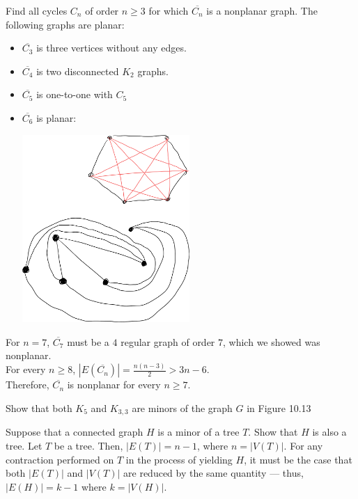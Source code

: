 \documentclass[8pt]{extarticle}
\begin{document}
  \begin{problem}{8}
    Find all cycles $C_n$ of order $n\geq 3$ for which $\overline{C_n}$ is a nonplanar graph.
    \tcblower
    The following graphs are planar:
    \begin{itemize}
      \item $\overline{C_3}$ is three vertices without any edges.
      \item $\overline{C_4}$ is two disconnected $K_2$ graphs.
      \item $\overline{C_5}$ is one-to-one with $C_5$
      \item $\overline{C_6}$ is planar:
        \begin{center}
          \includegraphics[width=0.5\textwidth]{images/10_8_sol.png}
        \end{center}
    \end{itemize}
    For $n = 7$, $ \overline{C_7} $ must be a $4$ regular graph of order $7$, which we showed was nonplanar.\\

    For every $n\geq 8$, $|E(\overline{C_n})| = \frac{n(n-3)}{2} > 3n-6$.\\

    Therefore, $\overline{C_n}$ is nonplanar for every $n\geq 7$.
  \end{problem}
  \begin{problem}{18}
    Show that both $K_{5}$ and $K_{3,3}$ are minors of the graph $G$ in Figure 10.13
  \end{problem}
  \begin{problem}{19}
    Suppose that a connected graph $H$ is a minor of a tree $T$. Show that $H$ is also a tree.
    \tcblower
    Let $T$ be a tree. Then, $|E(T)| = n-1$, where $n = |V(T)|$. For any contraction performed on $T$ in the process of yielding $H$, it must be the case that both $|E(T)|$ and $|V(T)|$ are reduced by the same quantity --- thus, $|E(H)| = k-1$ where $k = |V(H)|$.
  \end{problem}
\end{document}
